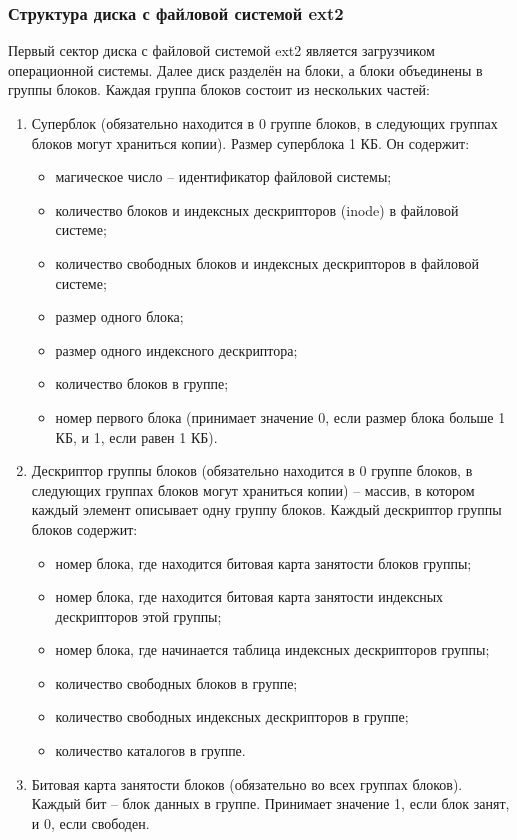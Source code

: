 \subsubsection{Структура диска с файловой системой ext2}

Первый сектор диска с файловой системой ext2 является загрузчиком операционной системы. Далее диск разделён на блоки, а блоки объединены в группы блоков.
Каждая группа блоков состоит из нескольких частей:

\begin{enumerate}
\item Суперблок (обязательно находится в 0 группе блоков, в следующих группах блоков могут храниться копии). Размер суперблока 1 КБ. Он содержит:
\begin{itemize}
\item магическое число -- идентификатор файловой системы;
\item количество блоков и индексных дескрипторов (inode) в файловой системе;
\item количество свободных блоков и индексных дескрипторов в файловой системе;
\item размер одного блока;
\item размер одного индексного дескриптора;
\item количество блоков в группе;
\item номер первого блока (принимает значение 0, если размер блока больше 1 КБ, и 1, если равен 1 КБ).
\end{itemize}
\item Дескриптор группы блоков (обязательно находится в 0 группе блоков, в следующих группах блоков могут храниться копии) -- массив, в котором каждый элемент описывает одну группу блоков.
Каждый дескриптор группы блоков содержит:
\begin{itemize}
\item номер блока, где находится битовая карта занятости блоков группы;
\item номер блока, где находится битовая карта занятости индексных дескрипторов этой группы;
\item номер блока, где начинается таблица индексных дескрипторов группы;
\item количество свободных блоков в группе;
\item количество свободных индексных дескрипторов в группе;
\item количество каталогов в группе.
\end{itemize}
\item Битовая карта занятости блоков (обязательно во всех группах блоков). Каждый бит -- блок данных в группе. Принимает значение 1, если блок занят, и 0, если свободен.

\end{enumerate}
